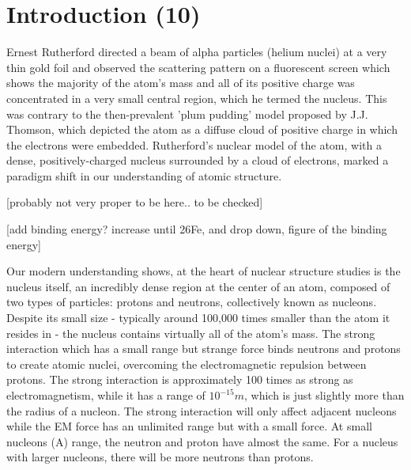 \chapter{Introduction (10)}

Ernest Rutherford directed a beam of alpha particles (helium nuclei) at a very thin gold foil and observed the scattering pattern on a fluorescent screen which shows the majority of the atom's mass and all of its positive charge was concentrated in a very small central region, which he termed the nucleus.  This was contrary to the then-prevalent 'plum pudding' model proposed by J.J. Thomson, which depicted the atom as a diffuse cloud of positive charge in which the electrons were embedded. Rutherford's nuclear model of the atom, with a dense, positively-charged nucleus surrounded by a cloud of electrons, marked a paradigm shift in our understanding of atomic structure.

[probably not very proper to be here.. to be checked] 

[add binding energy? increase until 26Fe, and drop down, figure of the binding energy]

Our modern understanding shows, at the heart of nuclear structure studies is the nucleus itself, an incredibly dense region at the center of an atom, composed of two types of particles: protons and neutrons, collectively known as nucleons. Despite its small size - typically around 100,000 times smaller than the atom it resides in - the nucleus contains virtually all of the atom's mass. The strong interaction which has a small range but strange force binds neutrons and protons to create atomic nuclei, overcoming the electromagnetic repulsion between protons. The strong interaction is approximately 100 times as strong as electromagnetism, while it has a range of $10^{-15}m$, which is just slightly more than the radius of a nucleon. The strong interaction will only affect adjacent nucleons while the EM force has an unlimited range but with a small force. At small nucleons (A) range, the neutron and proton have almost the same. For a nucleus with larger nucleons, there will be more neutrons than protons. 

